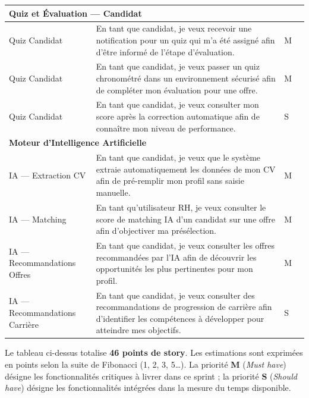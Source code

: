 \begin{small}
\begin{longtable}{|p{2.5cm}|p{6.8cm}|>{\centering\arraybackslash}p{2.2cm}|>{\centering\arraybackslash}p{2.2cm}|}
\multicolumn{4}{|l|}{\cellcolor[HTML]{F2F2F2}\textbf{Quiz et Évaluation — Candidat}} \\ \hline
Quiz Candidat & En tant que candidat, je veux recevoir une notification pour un quiz qui m'a été assigné afin d'être informé de l'étape d'évaluation. & M & 2 \\ \hline
Quiz Candidat & En tant que candidat, je veux passer un quiz chronométré dans un environnement sécurisé afin de compléter mon évaluation pour une offre. & M & 5 \\ \hline
Quiz Candidat & En tant que candidat, je veux consulter mon score après la correction automatique afin de connaître mon niveau de performance. & S & 2 \\ \hline

\multicolumn{4}{|l|}{\cellcolor[HTML]{F2F2F2}\textbf{Moteur d'Intelligence Artificielle}} \\ \hline
IA — Extraction CV & En tant que candidat, je veux que le système extraie automatiquement les données de mon CV afin de pré-remplir mon profil sans saisie manuelle. & M & 5 \\ \hline
IA — Matching & En tant qu'utilisateur RH, je veux consulter le score de matching IA d'un candidat sur une offre afin d'objectiver ma présélection. & M & 5 \\ \hline
IA — Recommandations Offres & En tant que candidat, je veux consulter les offres recommandées par l'IA afin de découvrir les opportunités les plus pertinentes pour mon profil. & M & 3 \\ \hline
IA — Recommandations Carrière & En tant que candidat, je veux consulter des recommandations de progression de carrière afin d'identifier les compétences à développer pour atteindre mes objectifs. & S & 3 \\ \hline

\end{longtable}
\end{small}
\renewcommand{\arraystretch}{1}

\noindent Le tableau ci-dessus totalise \textbf{46 points de story}. Les estimations sont exprimées en points selon la suite de Fibonacci (1, 2, 3, 5…). La priorité \textbf{M} (\textit{Must have}) désigne les fonctionnalités critiques à livrer dans ce sprint ; la priorité \textbf{S} (\textit{Should have}) désigne les fonctionnalités intégrées dans la mesure du temps disponible.

